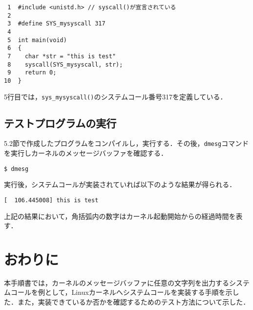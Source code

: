 \documentclass[12pt]{jsarticle}
\begin{document}
\begin{verbatim}
 1  #include <unistd.h> // syscall()が宣言されている
 2
 3  #define SYS_mysyscall 317
 4 
 5  int main(void)
 6  {
 7    char *str = "this is test"
 8    syscall(SYS_mysyscall, str);
 9    return 0;
10  } 
\end{verbatim}
5行目では，\verb|sys_mysyscall()|のシステムコール番号317を定義している．

\subsection{テストプログラムの実行}
5.2節で作成したプログラムをコンパイルし，実行する．その後，\verb|dmesg|コマンドを実行しカーネルのメッセージバッファを確認する．

\begin{verbatim}
$ dmesg
\end{verbatim}

実行後，システムコールが実装されていれば以下のような結果が得られる．
\begin{verbatim}
[  106.445008] this is test
\end{verbatim}
上記の結果において，角括弧内の数字はカーネル起動開始からの経過時間を表す．

\section{おわりに}
\label{sec:conclusion}
本手順書では，カーネルのメッセージバッファに任意の文字列を出力するシステムコールを例として，Linuxカーネルへシステムコールを実装する手順を示した．また，実装できているか否かを確認するためのテスト方法について示した．



\end{document}
